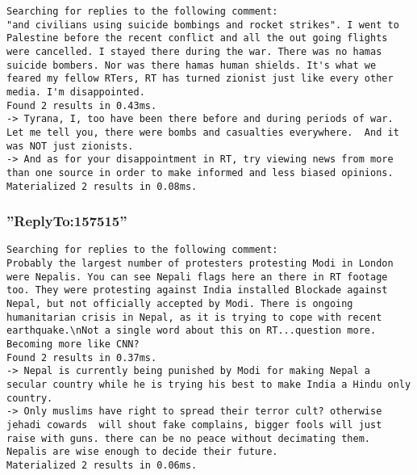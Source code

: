 \documentclass{scrartcl}
\begin{document}
\begin{lstlisting}
Searching for replies to the following comment:
"and civilians using suicide bombings and rocket strikes". I went to Palestine before the recent conflict and all the out going flights were cancelled. I stayed there during the war. There was no hamas suicide bombers. Nor was there hamas human shields. It's what we feared my fellow RTers, RT has turned zionist just like every other media. I'm disappointed.
Found 2 results in 0.43ms.
-> Tyrana, I, too have been there before and during periods of war.  Let me tell you, there were bombs and casualties everywhere.  And it was NOT just zionists.
-> And as for your disappointment in RT, try viewing news from more than one source in order to make informed and less biased opinions.
Materialized 2 results in 0.08ms.
\end{lstlisting}

\subsubsection{”ReplyTo:157515”}

\begin{lstlisting}
Searching for replies to the following comment:
Probably the largest number of protesters protesting Modi in London were Nepalis. You can see Nepali flags here an there in RT footage too. They were protesting against India installed Blockade against Nepal, but not officially accepted by Modi. There is ongoing humanitarian crisis in Nepal, as it is trying to cope with recent earthquake.\nNot a single word about this on RT...question more. Becoming more like CNN?
Found 2 results in 0.37ms.
-> Nepal is currently being punished by Modi for making Nepal a secular country while he is trying his best to make India a Hindu only country.
-> Only muslims have right to spread their terror cult? otherwise jehadi cowards  will shout fake complains, bigger fools will just raise with guns. there can be no peace without decimating them. Nepalis are wise enough to decide their future.
Materialized 2 results in 0.06ms.
\end{lstlisting}
\end{document}
